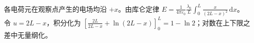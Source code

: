 各电荷元在观察点产生的电场均沿 $+x$。由库仑定律 $E=\frac{1}{4\pi\varepsilon_0}\frac{\lambda_0}{L}\int_0^L\frac{x}{(2L-x)^2}\,\mathrm dx$。令 $u=2L-x$，积分化为 $\left[\frac{2L}{2L-x}+\ln(2L-x)\right]_0^L=1-\ln2$；对数在上下限之差中无量纲化。
